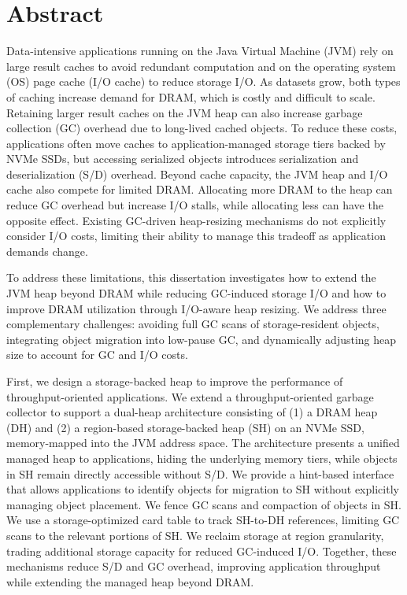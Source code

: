 \cleardoublepage

 
\chapter*{Abstract}

Data-intensive applications running on the Java Virtual Machine (JVM) rely on large result caches to avoid redundant computation and on the operating system (OS) page cache (I/O cache) to reduce storage I/O.
As datasets grow, both types of caching increase demand for DRAM, which is costly and difficult to scale.
Retaining larger result caches on the JVM heap can also increase garbage collection (GC) overhead due to long-lived cached objects.
To reduce these costs, applications often move caches to application-managed storage tiers backed by NVMe SSDs, but accessing serialized objects introduces serialization and deserialization (S/D) overhead.
Beyond cache capacity, the JVM heap and I/O cache also compete for limited DRAM.
Allocating more DRAM to the heap can reduce GC overhead but increase I/O stalls, while allocating less can have the opposite effect.
Existing GC-driven heap-resizing mechanisms do not explicitly consider I/O costs, limiting their ability to manage this tradeoff as application demands change.

To address these limitations, this dissertation investigates how to extend the JVM heap beyond DRAM while reducing GC-induced storage I/O and how to improve DRAM utilization through I/O-aware heap resizing.
We address three complementary challenges: avoiding full GC scans of storage-resident objects, integrating object migration into low-pause GC, and dynamically adjusting heap size to account for GC and I/O costs.

First, we design a storage-backed heap to improve the performance of throughput-oriented applications.
We extend a throughput-oriented garbage collector to support a dual-heap architecture consisting of (1) a DRAM heap (DH) and (2) a region-based storage-backed heap (SH) on an NVMe SSD, memory-mapped into the JVM address space.
The architecture presents a unified managed heap to applications, hiding the underlying memory tiers, while objects in SH remain directly accessible without S/D.
We provide a hint-based interface that allows applications to identify objects for migration to SH without explicitly managing object placement.
We fence GC scans and compaction of objects in SH.
We use a storage-optimized card table to track SH-to-DH references, limiting GC scans to the relevant portions of SH.
We reclaim storage at region granularity, trading additional storage capacity for reduced GC-induced I/O.
Together, these mechanisms reduce S/D and GC overhead, improving application throughput while extending the managed heap beyond DRAM.

